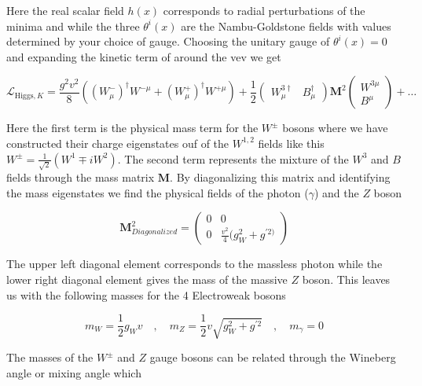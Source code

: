 Here the real scalar field $h(x)$ corresponds to radial perturbations of the
minima and while the three $\theta^{i}(x)$ are the Nambu-Goldstone fields with
values determined by your choice of gauge.  Choosing the unitary gauge of
$\theta^{i}(x) = 0$ and expanding the kinetic term of
 around the vev we get

\begin{equation} \label{eq:higgs:boson_masses}
\mathcal{L}_{\text{Higgs},K} = \frac{g^{2}v^{2}}{8} \left(
(W_{\mu}^{-})^{\dagger}W^{-\mu} + (W_{\mu}^{+})^{\dagger}W^{+\mu} \right) +
\frac{1}{2} \left( \begin{matrix} W_{\mu}^{3\dagger} & B_{\mu}^{\dagger}
\end{matrix} \right) \boldsymbol{M}^{2} \left( \begin{matrix} W^{3\mu} \\ B^{\mu}
\end{matrix} \right) + \ldots 
\end{equation}

Here the first term is the physical mass term for the $W^{\pm}$ bosons where we
have constructed their charge eigenstates ouf of the $W^{1,2}$ fields like this
$W^{\pm} = \frac{1}{\sqrt{2}}(W^{1} \mp iW^{2})$.  The second term represents the
mixture of the $W^{3}$ and $B$ fields through the mass matrix $\boldsymbol{M}$.
By diagonalizing this matrix and identifying the mass eigenstates we find the
physical fields of the photon ($\gamma$) and the $Z$ boson


\begin{equation}
\boldsymbol{M}_{Diagonalized}^{2} = \left( \begin{matrix} 0 & 0 \\ 0 &
\frac{v^{2}}{4}(g_{W}^{2} + g^{'2)}   \end{matrix} \right)
\end{equation}

The upper left diagonal element corresponds to the massless photon
while the lower right diagonal element gives the mass of the massive $Z$ boson.
This leaves us with the following masses for the 4 Electroweak bosons

\begin{equation}
m_{W} = \frac{1}{2}g_{W}v \quad , \quad m_Z = \frac{1}{2}v\sqrt{g_{W}^{2} + g^{'2}}
\quad , \quad m_\gamma = 0
\end{equation}

The masses of the $W^{\pm}$ and $Z$ gauge bosons can be related through the
Wineberg angle or mixing angle which

